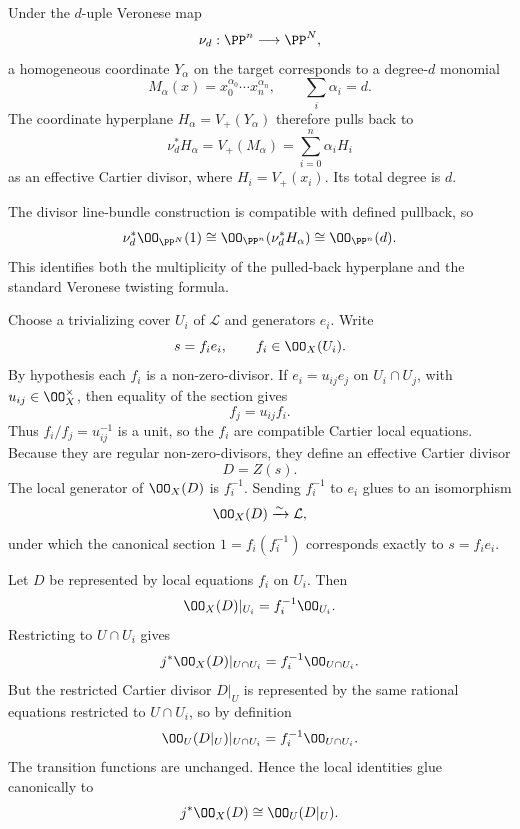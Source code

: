 \begin{solution}
Under the \(d\)-uple Veronese map
\[
\nu_d:\PP^n\longrightarrow\PP^N,
\]
a homogeneous coordinate \(Y_\alpha\) on the target corresponds to a degree-\(d\) monomial
\[
M_\alpha(x)=x_0^{\alpha_0}\cdots x_n^{\alpha_n},
\qquad \sum_i\alpha_i=d.
\]
The coordinate hyperplane \(H_\alpha=V_+(Y_\alpha)\) therefore pulls back to
\[
\nu_d^*H_\alpha=V_+(M_\alpha)
=\sum_{i=0}^n \alpha_i H_i
\]
as an effective Cartier divisor, where \(H_i=V_+(x_i)\).  Its total degree is \(d\).

The divisor line-bundle construction is compatible with defined pullback, so
\[
\nu_d^*\OO_{\PP^N}(1)
\cong\OO_{\PP^n}(\nu_d^*H_\alpha)
\cong\OO_{\PP^n}(d).
\]
This identifies both the multiplicity of the pulled-back hyperplane and the standard Veronese twisting formula.
\end{solution}

\begin{solution}
Choose a trivializing cover \(U_i\) of \(\mathcal L\) and generators \(e_i\).  Write
\[
s=f_i e_i,
\qquad f_i\in\OO_X(U_i).
\]
By hypothesis each \(f_i\) is a non-zero-divisor.  If \(e_i=u_{ij}e_j\) on \(U_i\cap U_j\), with \(u_{ij}\in\OO_X^\times\), then equality of the section gives
\[
f_j=u_{ij}f_i.
\]
Thus \(f_i/f_j=u_{ij}^{-1}\) is a unit, so the \(f_i\) are compatible Cartier local equations.  Because they are regular non-zero-divisors, they define an effective Cartier divisor
\[
D=Z(s).
\]
The local generator of \(\OO_X(D)\) is \(f_i^{-1}\).  Sending \(f_i^{-1}\) to \(e_i\) glues to an isomorphism
\[
\OO_X(D)\xrightarrow{\sim}\mathcal L,
\]
under which the canonical section \(1=f_i(f_i^{-1})\) corresponds exactly to \(s=f_i e_i\).
\end{solution}

\begin{solution}
Let \(D\) be represented by local equations \(f_i\) on \(U_i\).  Then
\[
\OO_X(D)|_{U_i}=f_i^{-1}\OO_{U_i}.
\]
Restricting to \(U\cap U_i\) gives
\[
j^*\OO_X(D)|_{U\cap U_i}
=f_i^{-1}\OO_{U\cap U_i}.
\]
But the restricted Cartier divisor \(D|_U\) is represented by the same rational equations restricted to \(U\cap U_i\), so by definition
\[
\OO_U(D|_U)|_{U\cap U_i}=f_i^{-1}\OO_{U\cap U_i}.
\]
The transition functions are unchanged.  Hence the local identities glue canonically to
\[
j^*\OO_X(D)\cong\OO_U(D|_U).
\]
\end{solution}

